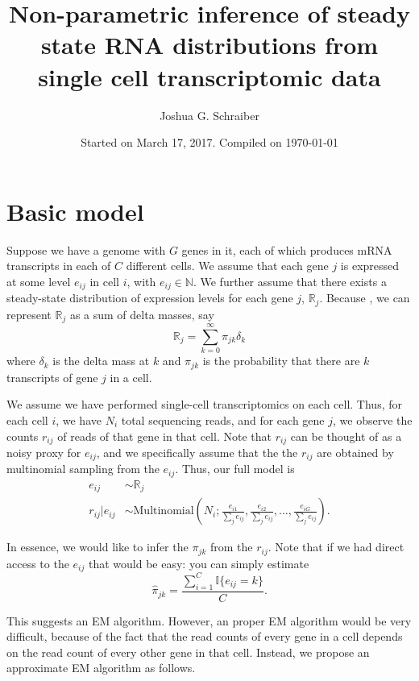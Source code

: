 \documentclass[11pt, oneside]{article}   	%
\title{Non-parametric inference of steady state RNA distributions from single cell transcriptomic data}
\author{Joshua G. Schraiber}
\date{Started on March 17, 2017. Compiled on \today}							%
\begin{document}
\maketitle
\section{Basic model}
Suppose we have a genome with $G$ genes in it, each of which produces mRNA transcripts in each of $C$ different cells. We assume that each gene $j$ is expressed at some level $e_{ij}$ in cell $i$, with $e_{ij} \in \mathbb{N}$. We further assume that there exists a steady-state distribution of expression levels for each gene $j$, $\mathbb{R}_j$. Because , we can represent $\mathbb{R}_j$ as a sum of delta masses, say
\[
\mathbb{R}_j = \sum_{k=0}^\infty \pi_{jk}\delta_k
\]
where $\delta_k$ is the delta mass at $k$ and $\pi_{jk}$ is the probability that there are $k$ transcripts of gene $j$ in a cell.

We assume we have performed single-cell transcriptomics on each cell. Thus, for each cell $i$, we have $N_i$ total sequencing reads, and for each gene $j$, we observe the counts $r_{ij}$ of reads of that gene in that cell. Note that $r_{ij}$ can be thought of as a noisy proxy for $e_{ij}$, and we specifically assume that the the $r_{ij}$ are obtained by multinomial sampling from the $e_{ij}$. Thus, our full model is
\begin{align*}
e_{ij} &\sim \mathbb{R}_j \\
r_{ij} | e_{ij} &\sim \text{Multinomial}\left(N_i; \frac{e_{i1}}{\sum_j{e_{ij}}},\frac{e_{i2}}{\sum_j{e_{ij}}},\ldots, \frac{e_{iG}}{\sum_j{e_{ij}}}\right).
\end{align*}

In essence, we would like to infer the $\pi_{jk}$ from the $r_{ij}$. Note that if we had direct access to the $e_{ij}$ that would be easy: you can simply estimate
\[
\hat{\pi}_{jk} = \frac{\sum_{i=1}^C \mathbb{I}\{e_{ij} = k\}}{C}.
\]

This suggests an EM algorithm. However, an proper EM algorithm would be very difficult, because of the fact that the read counts of every gene in a cell depends on the read count of every other gene in that cell. Instead, we propose an approximate EM algorithm as follows.
\end{document}
